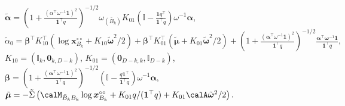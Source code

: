 \documentclass[12pt]{article}
\begin{document}
\begin{lemma}
$\tilde{\bm\alpha}=\left(1 + \frac{\left(\alpha^\top\omega^{-1}\bm 1\right)^2}{\bm 1^\top q}\right)^{-1/2}\omega_{(\bar B_k)} K_{01}\left(\mathbb{I} - \frac{\bm 1 q^\top}{\bm 1^\top q}\right)\omega^{-1}\bm\alpha$,\\
$\tilde\alpha_0 = \bm\beta^\top K_{10}^\top(\log \bm x_{B_k}^{\circ\circ}+K_{10}\tilde{\bm\omega}^2/2) + \bm\beta^\top K_{01}^\top(\tilde{\bm\mu} + K_{01}\tilde{\bm\omega}^2/2) +  \left(1 + \frac{(\bm\alpha^\top\omega^{-1}\bm 1)^2}{\bm 1^\top q}\right)^{-1/2}\frac{\bm\alpha^\top\bm\omega^{-1}\bm 1}{\bm 1^\top q},$ \\
$K_{10} = (\mathbb I_{k},\bm 0_{k,D-k})$, 
$K_{01} = (\bm 0_{D-k,k},\mathbb I_{D-k})$, 
$\bm\beta = \left(1 + \frac{(\bm\alpha^\top\omega^{-1}\bm 1)^2}{\bm 1^\top q}\right)^{-1/2}\left(\mathbb I - \frac{q\bm 1^\top}{\bm 1^\top q}\right)\omega^{-1}\bm\alpha$, \\
$\tilde{\bm\mu} = -\tilde\Sigma\left(\calM_{\bar B_kB_k}\log \bm x_{B_k}^{\circ\circ} + K_{01}q/(\bm 1^\top q)+K_{01}\calA\tilde{\bm\omega}^2/2\right).$
\end{lemma}
\end{document}
